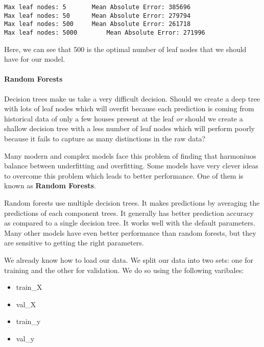 \documentclass[11pt]{article}
\providecommand{\tightlist}{%
      \setlength{\itemsep}{0pt}\setlength{\parskip}{0pt}}
\begin{document}
    \begin{Verbatim}[commandchars=\\\{\}]
Max leaf nodes: 5		Mean Absolute Error: 385696
Max leaf nodes: 50		Mean Absolute Error: 279794
Max leaf nodes: 500		Mean Absolute Error: 261718
Max leaf nodes: 5000		Mean Absolute Error: 271996

    \end{Verbatim}

    Here, we can see that 500 is the optimal number of leaf nodes that we
should have for our model.

    \hypertarget{random-forests}{%
\paragraph{Random Forests}\label{random-forests}}

Decision trees make us take a very difficult decision. Should we create
a deep tree with lots of leaf nodes which will overfit because each
prediction is coming from historical data of only a few houses present
at the leaf \emph{or} should we create a shallow decision tree with a
less number of leaf nodes which will perform poorly because it fails to
capture as many distinctions in the raw data?

Many modern and complex models face this problem of finding that
harmoniuos balance between underfitting and overfitting. Some models
have very clever ideas to overcome this problem which leads to better
performance. One of them is known as \textbf{Random Forests}.

    Random forests use multiple decision trees. It makes predictions by
averaging the predictions of each component trees. It generally has
better prediction accuracy as compared to a single decision tree. It
works well with the default parameters. Many other models have even
better performance than random forests, but they are sensitive to
getting the right parameters.

    We already know how to load our data. We split our data into two sets:
one for training and the other for validation. We do so using the
following varibales:

\begin{itemize}
\tightlist
\item
  train\_X
\item
  val\_X
\item
  train\_y
\item
  val\_y
\end{itemize}
\end{document}
